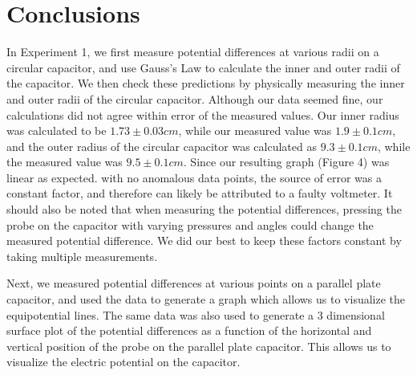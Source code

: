 \documentclass[letterpaper]{article}
\begin{document}
\section{Conclusions}
In Experiment 1, we first measure potential differences at various radii on a circular capacitor,
and use Gauss's Law to calculate the inner and outer radii of the capacitor. We then check these predictions
by physically measuring the inner and outer radii of the circular capacitor. Although our data seemed
fine, our calculations did not agree within error of the measured values. Our inner radius was calculated to be
$1.73 \pm 0.03 cm$, while our measured value was $1.9 \pm 0.1 cm$, and the outer radius of the circular capacitor
was calculated as $9.3 \pm 0.1 cm$, while the measured value was $9.5 \pm 0.1 cm$. Since our resulting graph (Figure 4)
was linear as expected. with no anomalous data points, the source of error was a constant factor, and therefore can
likely be attributed to a faulty voltmeter. It should also be noted that when measuring the potential differences, pressing
the probe on the capacitor with varying pressures and angles could change the measured potential difference.
We did our best to keep these factors constant by taking multiple measurements.

Next, we measured potential differences at various points on a parallel plate capacitor, and used the data to generate
a graph which allows us to visualize the equipotential lines. The same data was also used to generate a 3 dimensional
surface plot of the potential differences as a function of the horizontal and vertical position of the probe on the parallel plate
capacitor. This allows us to visualize the electric potential on the capacitor.

\end{document}
